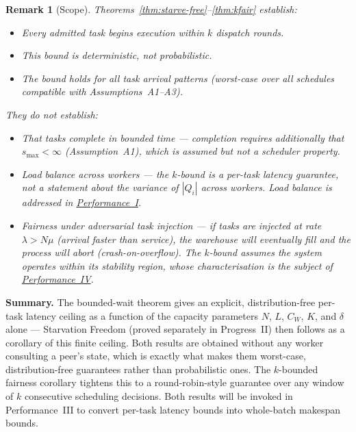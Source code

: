 \documentclass[11pt,a4paper]{report}
\newtheorem{remark}{Remark}[section]
\begin{document}
\begin{remark}[Scope]
Theorems~\ref{thm:starve-free}--\ref{thm:kfair} establish:
\begin{itemize}
  \item Every admitted task \emph{begins} execution within $k$
        dispatch rounds.
  \item This bound is \emph{deterministic}, not probabilistic.
  \item The bound holds for all task arrival patterns (worst-case
        over all schedules compatible with Assumptions~A1--A3).
\end{itemize}
They do \emph{not} establish:
\begin{itemize}
  \item That tasks complete in bounded time --- completion requires
        additionally that $s_{\max} < \infty$ (Assumption~A1),
        which is assumed but not a scheduler property.
  \item Load balance across workers --- the $k$-bound is a per-task
        latency guarantee, not a statement about the variance of
        $|Q_i|$ across workers.  Load balance is addressed in
        \hyperref[chap:load_balance]{Performance~I}.
  \item Fairness under adversarial task injection --- if tasks are
        injected at rate $\lambda > N\mu$ (arrival faster than
        service), the warehouse will eventually fill and the
        process will abort (crash-on-overflow).  The $k$-bound
        assumes the system operates within its stability region,
        whose characterisation is the subject of
        \hyperref[chap:stability]{Performance~IV}.
\end{itemize}
\end{remark}


\bigskip
\noindent\textbf{Summary.}
The bounded-wait theorem gives an explicit, distribution-free per-task
latency ceiling as a function of the capacity parameters $N$, $L$,
$C_W$, $K$, and $\delta$ alone --- Starvation Freedom (proved separately
in Progress~II) then follows as a corollary of this finite ceiling. Both
results are obtained without any worker consulting a peer's state, which
is exactly what makes them worst-case, distribution-free guarantees
rather than probabilistic ones.
The $k$-bounded fairness corollary tightens this to a round-robin-style
guarantee over any window of $k$ consecutive scheduling decisions.
Both results will be invoked in Performance~III to convert per-task
latency bounds into whole-batch makespan bounds.
\end{document}
